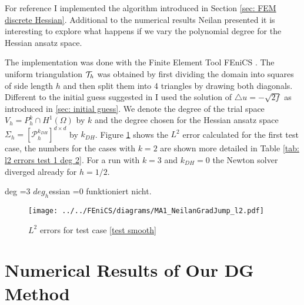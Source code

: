 For reference I implemented the algorithm introduced in Section \ref{sec: FEM discrete Hessian}.
Additional to the numerical results Neilan presented it is interesting to explore what happens if we vary the polynomial degree for the Hessian ansatz space. 

The implementation was done with the Finite Element Tool FEniCS \cite{FEniCS}. The uniform triangulation $\mathcal{T}_h$ was obtained by first dividing the domain into squares of side length $h$ and then split them into 4 triangles by drawing both diagonals. \\
Different to the initial guess suggested in \cite{Neilan2014} I used the solution of $\triangle u = -\sqrt{2f}$ as introduced in \ref{sec: initial guess}. 
We denote the degree of the trial space $V_h=P_h^k \cap H^1(\Omega)$ by $k$ and the degree chosen for the Hessian ansatz space $\Sigma_h = [\mathcal{P}_h^{k_{DH}}]^{d \times d}$ by $k_{DH}$.
Figure \ref{fig: l2 errors test 1} shows the $L^2$ error calculated for the first test case, the numbers for the cases with $k=2$ are shown more detailed in Table \ref{tab: l2 errors test 1 deg 2}. For a run with $k=3$ and $k_{DH}=0$  the Newton solver diverged already for $h=1/2$. 

%


deg =3 $deg_h$essian =0 funktioniert nicht.

\begin{figure}[h]
	\texttt{[image: ../../FEniCS/diagrams/MA1\_NeilanGradJump\_l2.pdf]}
	\caption{$L^2$ errors for test case \ref{test smooth}}
	\label{fig: l2 errors test 1}
\end{figure}

\section{Numerical Results of Our DG Method}


